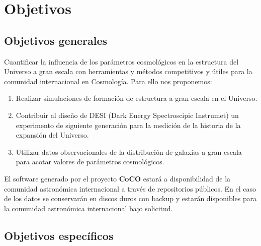 \section{Objetivos}

\subsection{Objetivos generales} 

Cuantificar la influencia de los par\'ametros cosmol\'ogicos en la
  estructura del Universo a gran escala con herramientas y m\'etodos competitivos y \'utiles para la comunidad internacional en Cosmolog\'ia. Para ello nos proponemos:

\begin{enumerate}
\item  Realizar simulaciones de formaci\'on de estructura a gran escala en el Universo.
\item Contribuir al dise\~no de DESI (Dark Energy Spectroscipic Instrumet) un experimento de siguiente generaci\'on para la medici\'on de la historia de la expansi\'on del Universo. 
\item Utilizar datos observacionales de la distribuci\'on de galaxias a gran escala para acotar valores de par\'ametros cosmol\'ogicos.

\end{enumerate}

El software generado por el proyecto {\bf CoCO} estar\'a a disponibilidad  de la comunidad astron\'omica internacional a trav\'es de repositorios p\'ublicos. En el caso de los datos se conservar\'an en discos duros con backup y estar\'an disponibles para la comunidad astron\'omica internacional bajo solicitud. 

\subsection{Objetivos espec\'ificos}


